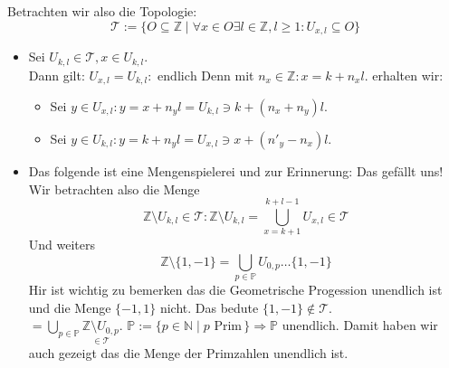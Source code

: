 Betrachten wir also die Topologie:
$$\mathcal{T} := \{ O \subseteq \mathbb{Z} \mid \forall x \in O \exists l \in \mathbb{Z}, l \ge 1 : U_{x,l} \subseteq O\}$$
\begin{itemize}
    \item Sei $U_{k,l} \in \mathcal{T}, x \in U_{k,l}$. \\
    Dann gilt: $U_{x,l}=U_{k,l} : \text{ endlich}$
    Denn mit $n_x \in \mathbb{Z}: x = k + n_x l$. erhalten wir: \\
    \begin{itemize}
        \item Sei $y \in U_{x,l}: y = x + n_y l = U_{k,l} \ni k + (n_x + n_y)l$.
        \item Sei $y \in U_{k,l}: y = k + n_y l = U_{x,l} \ni x + (n'_y - n_{x})l$.
    \end{itemize}

    \item Das folgende ist eine Mengenspielerei und zur Erinnerung: Das gefällt uns!\\
    Wir betrachten also die Menge $$\mathbb{Z} \setminus U_{k,l} \in \mathcal{T}: \mathbb{Z} \setminus U_{k,l} 
    = \underset{x= k+1}{\overset{k+l-1}{\bigcup}} U_{x,l} \in \mathcal{T}$$
    Und weiters 
    $$\mathbb{Z}\setminus\{1,-1\} = \underset{p \in \mathbb{P}}{\bigcup} U_{0,p} \dots \{1,-1\}$$
    Hir ist wichtig zu bemerken das die Geometrische Progession unendlich ist und die Menge $\{-1,1\}$ nicht. 
    Das bedute $\{1,-1\} \notin \mathcal{T}$.\\
    $= \underset{p \in \mathbb{P}}{\bigcup}\underset{\in \mathcal{T}}{\mathbb{Z}\setminus{U_{0,p}}}$. 
    $\mathbb{P}:= \{p \in \mathbb{N} \mid p \text{ Prim} \,\} \Rightarrow \mathbb{P} \text{ unendlich}$.
    Damit haben wir auch gezeigt das die Menge der Primzahlen unendlich ist.
    
\end{itemize}

